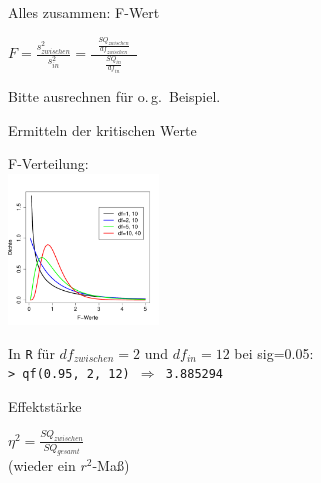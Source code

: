 \begin{frame}
  {Alles zusammen: F-Wert}
  \begin{center}
    $F=\frac{s^2_{zwischen}}{s^2_{in}}=\frac{\ \ \ \frac{SQ_{zwischen}}{df_{zwischen}}\ \ \ }{\frac{SQ_{in}}{df_{in}}}$\\
  \end{center}

  \vspace{0.5cm}
  \begin{center}
    Bitte ausrechnen für o.\,g.\ Beispiel.
  \end{center}
\end{frame}

\begin{frame}
  {Ermitteln der kritischen Werte}
  \begin{center}
    F-Verteilung:\\
    \includegraphics[width=0.3\textwidth]{graphics/anova_fdist}
  \end{center}

  \vspace{0.5cm}
  In \texttt{R} für $df_{zwischen}=2$ und $df_{in}=12$ bei sig=0.05:\\
  \texttt{> qf(0.95, 2, 12) $\Rightarrow$ 3.885294}
\end{frame}

\begin{frame}
  {Effektstärke}

  \begin{center}
    \alert{$\eta^2=\frac{SQ_{zwischen}}{SQ_{gesamt}}$}\\[4ex]
    (wieder ein $r^2$-Maß)
  \end{center}
\end{frame}

